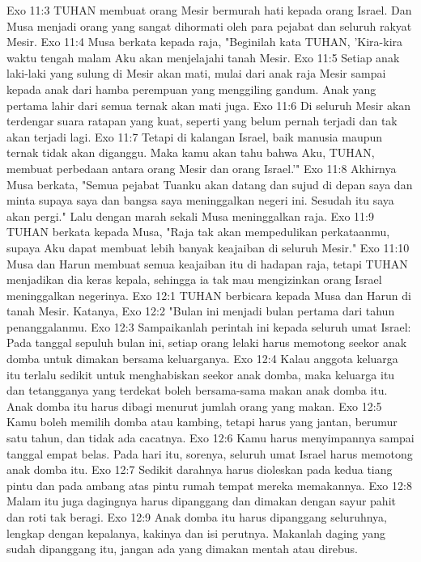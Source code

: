 Exo 11:3  TUHAN membuat orang Mesir bermurah hati kepada orang Israel. Dan Musa menjadi orang yang sangat dihormati oleh para pejabat dan seluruh rakyat Mesir.
Exo 11:4  Musa berkata kepada raja, "Beginilah kata TUHAN, 'Kira-kira waktu tengah malam Aku akan menjelajahi tanah Mesir.
Exo 11:5  Setiap anak laki-laki yang sulung di Mesir akan mati, mulai dari anak raja Mesir sampai kepada anak dari hamba perempuan yang menggiling gandum. Anak yang pertama lahir dari semua ternak akan mati juga.
Exo 11:6  Di seluruh Mesir akan terdengar suara ratapan yang kuat, seperti yang belum pernah terjadi dan tak akan terjadi lagi.
Exo 11:7  Tetapi di kalangan Israel, baik manusia maupun ternak tidak akan diganggu. Maka kamu akan tahu bahwa Aku, TUHAN, membuat perbedaan antara orang Mesir dan orang Israel.'"
Exo 11:8  Akhirnya Musa berkata, "Semua pejabat Tuanku akan datang dan sujud di depan saya dan minta supaya saya dan bangsa saya meninggalkan negeri ini. Sesudah itu saya akan pergi." Lalu dengan marah sekali Musa meninggalkan raja.
Exo 11:9  TUHAN berkata kepada Musa, "Raja tak akan mempedulikan perkataanmu, supaya Aku dapat membuat lebih banyak keajaiban di seluruh Mesir."
Exo 11:10  Musa dan Harun membuat semua keajaiban itu di hadapan raja, tetapi TUHAN menjadikan dia keras kepala, sehingga ia tak mau mengizinkan orang Israel meninggalkan negerinya.
Exo 12:1  TUHAN berbicara kepada Musa dan Harun di tanah Mesir. Katanya,
Exo 12:2  "Bulan ini menjadi bulan pertama dari tahun penanggalanmu.
Exo 12:3  Sampaikanlah perintah ini kepada seluruh umat Israel: Pada tanggal sepuluh bulan ini, setiap orang lelaki harus memotong seekor anak domba untuk dimakan bersama keluarganya.
Exo 12:4  Kalau anggota keluarga itu terlalu sedikit untuk menghabiskan seekor anak domba, maka keluarga itu dan tetangganya yang terdekat boleh bersama-sama makan anak domba itu. Anak domba itu harus dibagi menurut jumlah orang yang makan.
Exo 12:5  Kamu boleh memilih domba atau kambing, tetapi harus yang jantan, berumur satu tahun, dan tidak ada cacatnya.
Exo 12:6  Kamu harus menyimpannya sampai tanggal empat belas. Pada hari itu, sorenya, seluruh umat Israel harus memotong anak domba itu.
Exo 12:7  Sedikit darahnya harus dioleskan pada kedua tiang pintu dan pada ambang atas pintu rumah tempat mereka memakannya.
Exo 12:8  Malam itu juga dagingnya harus dipanggang dan dimakan dengan sayur pahit dan roti tak beragi.
Exo 12:9  Anak domba itu harus dipanggang seluruhnya, lengkap dengan kepalanya, kakinya dan isi perutnya. Makanlah daging yang sudah dipanggang itu, jangan ada yang dimakan mentah atau direbus.
